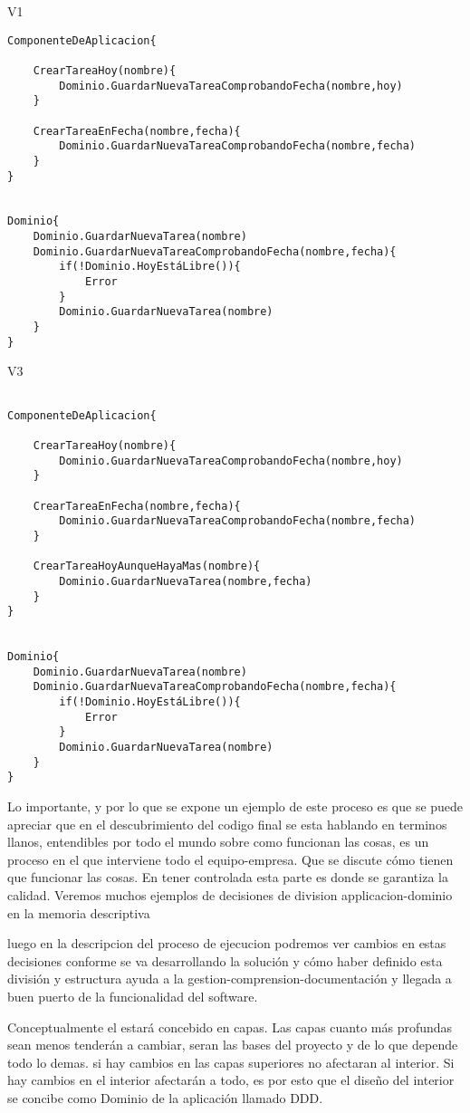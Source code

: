 V1

\begin{verbatim}
ComponenteDeAplicacion{

    CrearTareaHoy(nombre){
        Dominio.GuardarNuevaTareaComprobandoFecha(nombre,hoy)
    }

    CrearTareaEnFecha(nombre,fecha){
        Dominio.GuardarNuevaTareaComprobandoFecha(nombre,fecha)
    }
}


Dominio{
    Dominio.GuardarNuevaTarea(nombre)
    Dominio.GuardarNuevaTareaComprobandoFecha(nombre,fecha){
        if(!Dominio.HoyEstáLibre()){
            Error
        }
        Dominio.GuardarNuevaTarea(nombre)
    }
}

\end{verbatim}

V3

\begin{verbatim}

ComponenteDeAplicacion{

    CrearTareaHoy(nombre){
        Dominio.GuardarNuevaTareaComprobandoFecha(nombre,hoy)
    }

    CrearTareaEnFecha(nombre,fecha){
        Dominio.GuardarNuevaTareaComprobandoFecha(nombre,fecha)
    }

    CrearTareaHoyAunqueHayaMas(nombre){
        Dominio.GuardarNuevaTarea(nombre,fecha)
    }
}


Dominio{
    Dominio.GuardarNuevaTarea(nombre)
    Dominio.GuardarNuevaTareaComprobandoFecha(nombre,fecha){
        if(!Dominio.HoyEstáLibre()){
            Error
        }
        Dominio.GuardarNuevaTarea(nombre)
    }
}
\end{verbatim}

Lo importante, y por lo que se expone un ejemplo de este proceso es que se puede apreciar que en el descubrimiento del codigo final se esta hablando en terminos llanos, entendibles por todo el mundo sobre como funcionan las cosas, es un proceso en el que interviene todo el equipo-empresa. Que se discute cómo tienen que funcionar las cosas. En tener controlada esta parte es donde se garantiza la calidad. Veremos muchos ejemplos de decisiones de division applicacion-dominio en la memoria descriptiva

luego en la descripcion del proceso de ejecucion podremos ver cambios en estas decisiones conforme se va desarrollando la solución y cómo haber definido esta división y estructura ayuda a la gestion-comprension-documentación y llegada a buen puerto de la funcionalidad del software.


Conceptualmente el estará concebido en capas. Las capas cuanto más profundas sean menos tenderán a cambiar, seran las bases del proyecto y de lo que depende todo lo demas. si hay cambios en las capas superiores no afectaran al interior. Si hay cambios en el interior afectarán a todo, es por esto que el diseño del interior se concibe como Dominio de la aplicación llamado DDD.